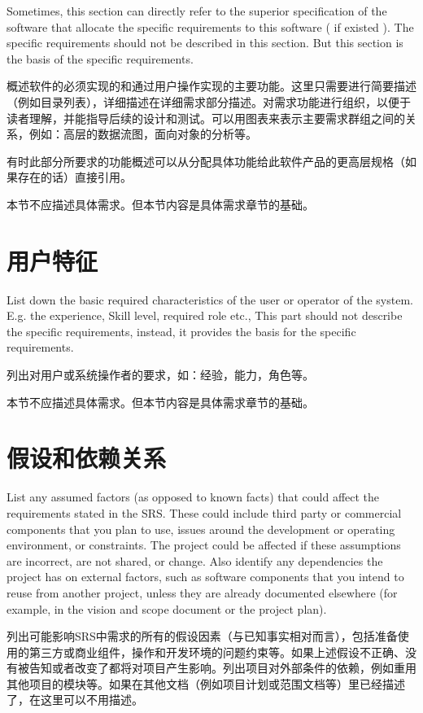 Sometimes, this section can directly refer to the superior specification of the software that allocate the specific requirements to this software ( if existed ).
The specific requirements should not be described in this section. But this section is the basis of the specific requirements.

概述软件的必须实现的和通过用户操作实现的主要功能。这里只需要进行简要描述（例如目录列表），详细描述在详细需求部分描述。对需求功能进行组织，以便于读者理解，并能指导后续的设计和测试。可以用图表来表示主要需求群组之间的关系，例如：高层的数据流图，面向对象的分析等。

有时此部分所要求的功能概述可以从分配具体功能给此软件产品的更高层规格（如果存在的话）直接引用。

本节不应描述具体需求。但本节内容是具体需求章节的基础。

\section{用户特征}
List down the basic required characteristics of the user or operator of the system. E.g. the experience, Skill level, required role etc., 
This part should not describe the specific requirements, instead, it provides the basis for the specific requirements.

列出对用户或系统操作者的要求，如：经验，能力，角色等。

本节不应描述具体需求。但本节内容是具体需求章节的基础。

\section{假设和依赖关系}
List any assumed factors (as opposed to known facts) that could affect the requirements stated in the SRS. These could include third party or commercial components that you plan to use, issues around the development or operating environment, or constraints. The project could be affected if these assumptions are incorrect, are not shared, or change. Also identify any dependencies the project has on external factors, such as software components that you intend to reuse from another project, unless they are already documented elsewhere (for example, in the vision and scope document or the project plan). 

列出可能影响SRS中需求的所有的假设因素（与已知事实相对而言），包括准备使用的第三方或商业组件，操作和开发环境的问题约束等。如果上述假设不正确、没有被告知或者改变了都将对项目产生影响。列出项目对外部条件的依赖，例如重用其他项目的模块等。如果在其他文档（例如项目计划或范围文档等）里已经描述了，在这里可以不用描述。
